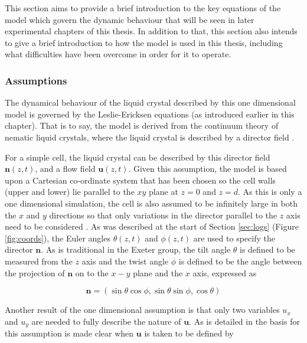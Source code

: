 This section aims to provide a brief introduction to the key equations of the model which govern the dynamic behaviour that will be seen in later experimental chapters of this thesis. In addition to that, this section also intends to give a brief introduction to how the model is used in this thesis, including what difficulties have been overcome in order for it to operate.
 
\subsubsection{Assumptions}
The dynamical behaviour of the liquid crystal described by this one dimensional model is governed by the Leslie-Ericksen equations (as introduced earlier in this chapter). That is to say, the model is derived from the continuum theory of nematic liquid crystals, where the liquid crystal is described by a director field \cite{Cornford2008}.

For a simple cell, the liquid crystal can be described by this director field $\mathbf{n}\left(z,t\right)$, and a flow field $\mathbf{u}\left(z,t\right)$. Given this assumption, the model is based upon a Cartesian co-ordinate system that has been chosen so the cell walls (upper and lower) lie parallel to the $xy$ plane at $z=0$ and $z=d$. As this is only a one dimensional simulation, the cell is also assumed to be infinitely large in both the $x$ and $y$ directions so that only variations in the director parallel to the $z$ axis need to be considered \cite{Cornford2008}. As was described at the start of Section \ref{sec:logs} (Figure \ref{fig:coords}), the Euler angles $\theta\left(z,t\right)$ and $\phi\left(z,t\right)$ are used to specify the director $\mathbf{n}$. As is traditional in the Exeter group, the tilt angle $\theta$ is defined to be measured from the $z$ axis and the twist angle $\phi$ is defined to be the angle between the projection of $\mathbf{n}$ on to the $x-y$ plane and the $x$ axis, expressed as

\begin{equation}
\mathbf{n}=\left(\sin\theta\cos\phi,\sin\theta\sin\phi,\cos\theta\right)
\end{equation}

Another result of the one dimensional assumption is that only two variables $u_x$ and $u_y$ are needed to fully describe the nature of $\mathbf{u}$. As is detailed in \cite{Cornford2008} the basis for this assumption is made clear when $\mathbf{u}$ is taken to be defined by


